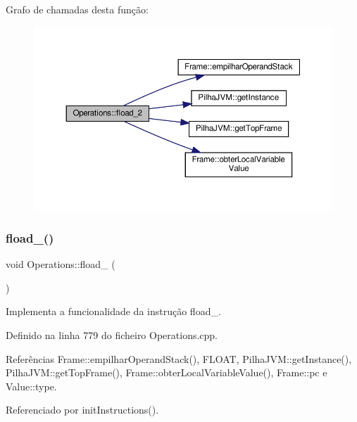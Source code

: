 Grafo de chamadas desta função\+:\nopagebreak
\begin{figure}[H]
\begin{center}
\leavevmode
\includegraphics[width=350pt]{classOperations_a1d1767084d543ab73c8417efe11e195e_cgraph}
\end{center}
\end{figure}
\mbox{\label{classOperations_a1d7d4685fea35e0619ff468ed57a4f94}} 
\subsubsection{\texorpdfstring{fload\+\_()}{fload\_3()}}
{\footnotesize\ttfamily void Operations\+::fload\+\_ (\begin{DoxyParamCaption}{ }\end{DoxyParamCaption})\hspace{0.3cm}{\ttfamily [private]}}



Implementa a funcionalidade da instrução fload\+\_. 



Definido na linha 779 do ficheiro Operations.\+cpp.



Referências Frame\+::empilhar\+Operand\+Stack(), F\+L\+O\+AT, Pilha\+J\+V\+M\+::get\+Instance(), Pilha\+J\+V\+M\+::get\+Top\+Frame(), Frame\+::obter\+Local\+Variable\+Value(), Frame\+::pc e Value\+::type.



Referenciado por init\+Instructions().

